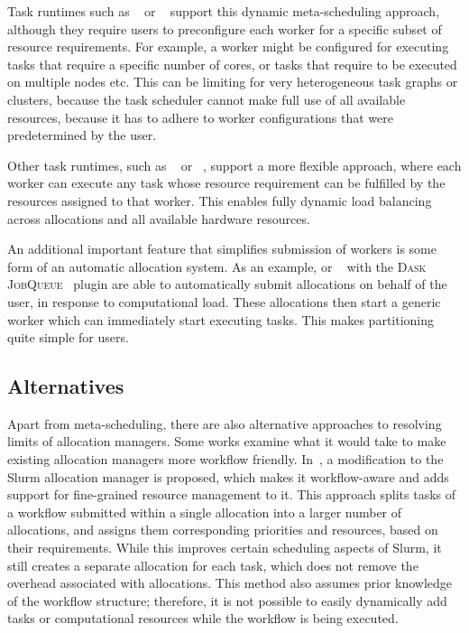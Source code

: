 Task runtimes such as \merlin{}~\cite{merlin} or \parsl{}~\cite{parsl} support this dynamic
meta-scheduling approach, although they require users to preconfigure each worker for a specific
subset of resource requirements. For example, a worker might be configured for executing tasks
that require a specific number of cores, or tasks that require to be executed on multiple nodes
etc. This can be limiting for very heterogeneous task graphs or clusters, because the task scheduler
cannot make full use of all available resources, because it has to adhere to worker configurations
that were predetermined by the user.

Other task runtimes, such as \balsam{}~\cite{balsam} or \fireworks~\cite{fireworks}, support a
more flexible approach, where each worker can execute any task whose resource requirement can be
fulfilled by the resources assigned to that worker. This enables fully dynamic load balancing
across allocations and all available hardware resources.

An additional important feature that simplifies submission of workers is some form of an automatic
allocation system. As an example, \balsam{} or \dask{}~\cite{dask} with the
\textsc{Dask JobQueue}~\cite{dask-jobqueue} plugin are able to automatically submit allocations
on behalf of the user, in response to computational load. These allocations then start a generic
worker which can immediately start executing tasks. This makes partitioning quite simple for users.

\subsection*{Alternatives}
Apart from meta-scheduling, there are also alternative approaches to resolving limits of
allocation managers. Some works examine what it would take to make existing allocation
managers more workflow friendly. In~\cite{slurm-workflow}, a modification to the Slurm allocation
manager is proposed, which makes it workflow-aware and adds support for fine-grained resource
management to it. This approach splits tasks of a workflow submitted within a single allocation
into a larger number of allocations, and assigns them corresponding priorities and resources, based
on their requirements. While this improves certain scheduling aspects of Slurm, it still creates a
separate allocation for each task, which does not remove the overhead associated with allocations.
This method also assumes prior knowledge of the workflow structure; therefore, it is not possible
to easily dynamically add tasks or computational resources while the workflow is being executed.

